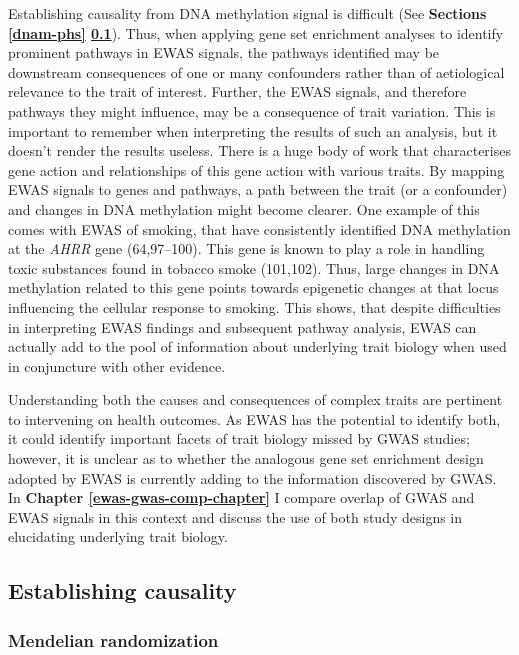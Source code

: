 \documentclass[11pt,oneside]{bristolthesis}
\begin{document}
Establishing causality from DNA methylation signal is difficult (See \textbf{Sections \ref{dnam-phs} \ref{establishing-causality}}). Thus, when applying gene set enrichment analyses to identify prominent pathways in EWAS signals, the pathways identified may be downstream consequences of one or many confounders rather than of aetiological relevance to the trait of interest. Further, the EWAS signals, and therefore pathways they might influence, may be a consequence of trait variation. This is important to remember when interpreting the results of such an analysis, but it doesn't render the results useless. There is a huge body of work that characterises gene action and relationships of this gene action with various traits. By mapping EWAS signals to genes and pathways, a path between the trait (or a confounder) and changes in DNA methylation might become clearer. One example of this comes with EWAS of smoking, that have consistently identified DNA methylation at the \emph{AHRR} gene (64,97--100). This gene is known to play a role in handling toxic substances found in tobacco smoke (101,102). Thus, large changes in DNA methylation related to this gene points towards epigenetic changes at that locus influencing the cellular response to smoking. This shows, that despite difficulties in interpreting EWAS findings and subsequent pathway analysis, EWAS can actually add to the pool of information about underlying trait biology when used in conjuncture with other evidence.

Understanding both the causes and consequences of complex traits are pertinent to intervening on health outcomes. As EWAS has the potential to identify both, it could identify important facets of trait biology missed by GWAS studies; however, it is unclear as to whether the analogous gene set enrichment design adopted by EWAS is currently adding to the information discovered by GWAS. In \textbf{Chapter \ref{ewas-gwas-comp-chapter}} I compare overlap of GWAS and EWAS signals in this context and discuss the use of both study designs in elucidating underlying trait biology.

\hypertarget{establishing-causality}{%
\subsection{Establishing causality}\label{establishing-causality}}

\hypertarget{mr-01}{%
\subsubsection{Mendelian randomization}\label{mr-01}}
\end{document}
